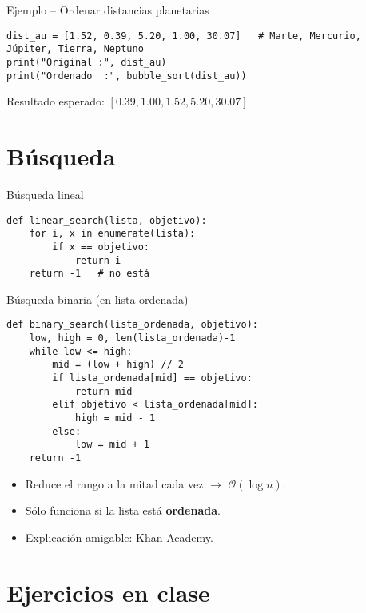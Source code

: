 \documentclass[10pt]{beamer}
\begin{document}
\begin{frame}[fragile]{Ejemplo -- Ordenar distancias planetarias}
\begin{verbatim}
dist_au = [1.52, 0.39, 5.20, 1.00, 30.07]   # Marte, Mercurio, Júpiter, Tierra, Neptuno
print("Original :", dist_au)
print("Ordenado  :", bubble_sort(dist_au))
\end{verbatim}
\pause
Resultado esperado: \([0.39, 1.00, 1.52, 5.20, 30.07]\)
\end{frame}

\section{Búsqueda}
\begin{frame}[fragile]{Búsqueda lineal}
\begin{verbatim}
def linear_search(lista, objetivo):
    for i, x in enumerate(lista):
        if x == objetivo:
            return i
    return -1   # no está
\end{verbatim}
\end{frame}

\begin{frame}[fragile]{Búsqueda binaria (en lista ordenada)}
\begin{verbatim}
def binary_search(lista_ordenada, objetivo):
    low, high = 0, len(lista_ordenada)-1
    while low <= high:
        mid = (low + high) // 2
        if lista_ordenada[mid] == objetivo:
            return mid
        elif objetivo < lista_ordenada[mid]:
            high = mid - 1
        else:
            low = mid + 1
    return -1
\end{verbatim}
\begin{itemize}
  \item Reduce el rango a la mitad cada vez $\longrightarrow$ \(\mathcal{O}(\log n)\).  
  \item Sólo funciona si la lista está \textbf{ordenada}.  
  \item Explicación amigable: \href{https://es.khanacademy.org/computing/computer-science/algorithms/binary-search/a/binary-search}{Khan Academy}.
\end{itemize}
\end{frame}

\section{Ejercicios en clase}
\end{document}
